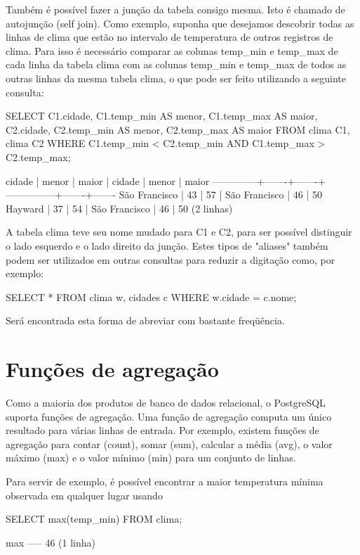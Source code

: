 Também é possível fazer a junção da tabela consigo mesma. Isto é chamado de autojunção (self join). Como exemplo, suponha que desejamos descobrir todas as linhas de clima que estão no intervalo de temperatura de outros registros de clima. Para isso é necessário comparar as colunas temp\_min e temp\_max de cada linha da tabela clima com as colunas temp\_min e temp\_max de todos as outras linhas da mesma tabela clima, o que pode ser feito utilizando a seguinte consulta:
\begin{BoxVerbatim}
SELECT C1.cidade, C1.temp_min AS menor, C1.temp_max AS maior,
    C2.cidade, C2.temp_min AS menor, C2.temp_max AS maior
    FROM clima C1, clima C2
    WHERE C1.temp_min < C2.temp_min
    AND C1.temp_max > C2.temp_max;



 cidade          | menor | maior |     cidade    | menor | maior
   --------------+-------+-------+---------------+-------+-------
 São Francisco   |    43 |    57 | São Francisco |    46 |    50
 Hayward         |    37 |    54 | São Francisco |    46 |    50
 (2 linhas)
\end{BoxVerbatim}

A tabela clima teve seu nome mudado para C1 e C2, para ser possível distinguir o lado esquerdo e o lado direito da junção. Estes tipos de "aliases" também podem ser utilizados em outras consultas para reduzir a digitação como, por exemplo:

\begin{BoxVerbatim}
SELECT *
    FROM clima w, cidades c
    WHERE w.cidade = c.nome;
\end{BoxVerbatim}
Será encontrada esta forma de abreviar com bastante freqüência.

\section{ Funções de agregação }\setcounter{SteP}{1}
Como a maioria dos produtos de banco de dados relacional, o PostgreSQL suporta funções de agregação. Uma função de agregação computa um único resultado para várias linhas de entrada. Por exemplo, existem funções de agregação para contar (count), somar (sum), calcular a média (avg), o valor máximo (max) e o valor mínimo (min) para um conjunto de linhas.

Para servir de exemplo, é possível encontrar a maior temperatura mínima observada em qualquer lugar usando
\begin{BoxVerbatim}
SELECT max(temp_min) FROM clima;

 max
 -----
   46
 (1 linha)
\end{BoxVerbatim}
